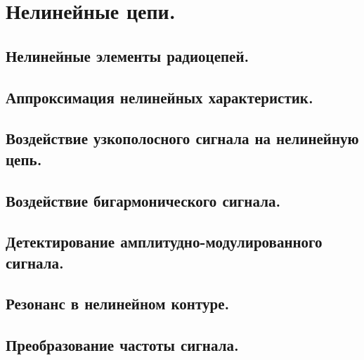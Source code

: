 \documentclass[../main/main.tex]{subfiles}
\begin{document}
\section{Нелинейные цепи.}

\subsection{Нелинейные элементы радиоцепей.}

\subsection{Аппроксимация нелинейных характеристик.}

\subsection{Воздействие узкополосного сигнала на нелинейную цепь.}

\subsection{Воздействие бигармонического сигнала.}

\subsection{Детектирование амплитудно-модулированного сигнала.}

\subsection{Резонанс в нелинейном контуре.}

\subsection{Преобразование частоты сигнала.}
\end{document}
